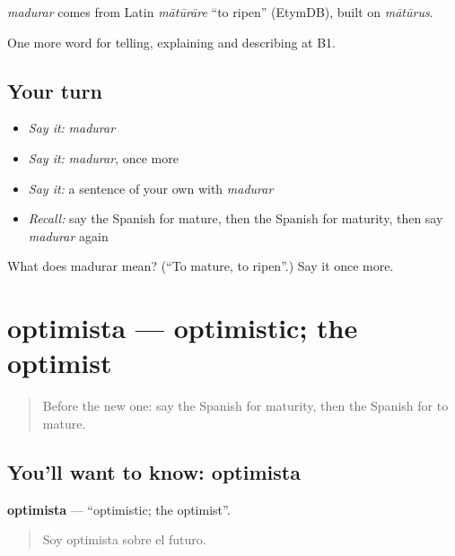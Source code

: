 \begin{cousinweb}
\emph{madurar} comes from Latin \emph{mātūrāre} \textquotedblleft{}to ripen\textquotedblright{} (EtymDB), built on \emph{mātūrus}.
\end{cousinweb}

\begin{grammarlens}[title={What you've built}]
One more word for telling, explaining and describing at B1.
\end{grammarlens}

\subsection*{Your turn}
\begin{itemize}
\raggedright
  \item \emph{Say it:} \emph{madurar}
  \item \emph{Say it:} \emph{madurar}, once more
  \item \emph{Say it:} a sentence of your own with \emph{madurar}
  \item \emph{Recall:} say the Spanish for mature, then the Spanish for maturity, then say \emph{madurar} again
\end{itemize}

\begin{tcolorbox}[breakable,colback=teal!4,colframe=teal!35!black,title={Before you move on}]
What does madurar mean? (\textquotedblleft{}To mature, to ripen\textquotedblright{}.) Say it once more.
\end{tcolorbox}
\section[optimista]{optimista — optimistic; the optimist}

\label{lesson:ES-C731-optimista}



\begin{quote}
Before the new one: say the Spanish for maturity, then the Spanish for to mature.
\end{quote}

\subsection*{You'll want to know: optimista}
\textbf{optimista} — \textquotedblleft{}optimistic; the optimist\textquotedblright{}.

\begin{quote}
Soy optimista sobre el futuro.
\end{quote}

